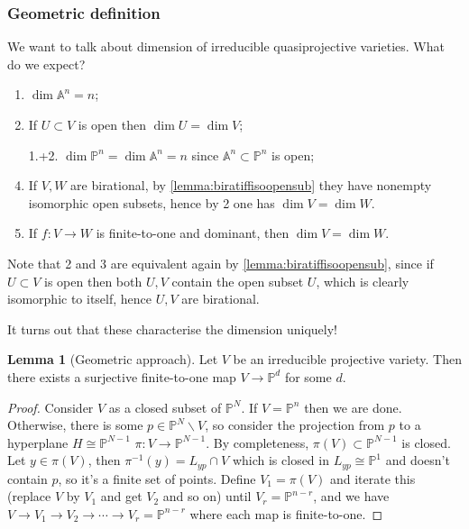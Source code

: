 \documentclass{article}
\newcommand{\A}{\mathbb{A}}
\newcommand{\p}{\mathbb{P}}
\theoremstyle{definition}
\newtheorem{lemma}[defn]{Lemma}
\begin{document}
\subsubsection{Geometric definition}
We want to talk about dimension of irreducible quasiprojective varieties. What do we expect?
\begin{enumerate}
\item $\dim\A^n=n$;
\item If $U\subset V$ is open then $\dim U=\dim V$;
\item[1.+2.] $\dim\p^n=\dim\A^n=n$ since $\A^n\subset\p^n$ is open;
\item If $V,W$ are birational, by \ref{lemma:biratiffisoopensub} they have nonempty isomorphic open subsets, hence by 2 one has $\dim V=\dim W$.
\item If $f:V\rightarrow W$ is finite-to-one and dominant, then $\dim V=\dim W$.
\end{enumerate}
Note that 2 and 3 are equivalent again by \ref{lemma:biratiffisoopensub}, since if $U\subset V$ is open then both $U,V$ contain the open subset $U$, which is clearly isomorphic to itself, hence $U,V$ are birational.

It turns out that these characterise the dimension uniquely!

\begin{lemma}[Geometric approach]
Let $V$ be an irreducible projective variety. Then there exists a surjective finite-to-one map $V\rightarrow\p^d$ for some $d$.
\end{lemma}
\begin{proof}
Consider $V$ as a closed subset of $\p^N$. If $V=\p^n$ then we are done. Otherwise, there is some $p\in\p^N\backslash V$, so consider the projection from $p$ to a hyperplane $H\cong\p^{N-1}$ $\pi:V\rightarrow\p^{N-1}$. By completeness, $\pi(V)\subset\p^{N-1}$ is closed. Let $y\in\pi(V)$, then $\pi^{-1}(y)=L_{yp}\cap V$ which is closed in $L_{yp}\cong\p^1$ and doesn't contain $p$, so it's a finite set of points. Define $V_1=\pi(V)$ and iterate this (replace $V$ by $V_1$ and get $V_2$ and so on) until $V_r=\p^{n-r}$, and we have $V\rightarrow V_1\rightarrow V_2\rightarrow\cdots\rightarrow V_r=\p^{n-r}$ where each map is finite-to-one.
\end{proof}
\end{document}
